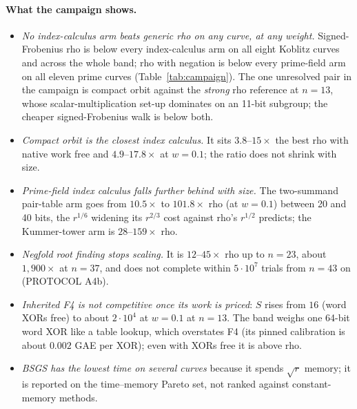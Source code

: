 \paragraph{What the campaign shows.}
\begin{itemize}
\item \emph{No index-calculus arm beats generic rho on any curve, at any
  weight.} Signed-Frobenius rho is below every index-calculus arm on all
  eight Koblitz curves and across the whole band; rho with negation is
  below every prime-field arm on all eleven prime curves
  (Table~\ref{tab:campaign}). The one unresolved pair in the campaign is
  compact orbit against the \emph{strong} rho reference at $n=13$, whose
  scalar-multiplication set-up dominates on an 11-bit subgroup; the
  cheaper signed-Frobenius walk is below both.
\item \emph{Compact orbit is the closest index calculus.} It sits
  $3.8$--$15\times$ the best rho with native work free and
  $4.9$--$17.8\times$ at $w=0.1$; the ratio does not shrink with size.
\item \emph{Prime-field index calculus falls further behind with size.}
  The two-summand pair-table arm goes from $10.5\times$ to $101.8\times$
  rho (at $w=0.1$) between 20 and 40 bits, the $r^{1/6}$ widening its
  $r^{2/3}$ cost against rho's $r^{1/2}$ predicts; the Kummer-tower arm is
  $28$--$159\times$ rho.
\item \emph{Negfold root finding stops scaling.} It is $12$--$45\times$
  rho up to $n=23$, about $1{,}900\times$ at $n=37$, and does not complete
  within $5\cdot10^7$ trials from $n=43$ on (PROTOCOL A4b).
\item \emph{Inherited F4 is not competitive once its work is priced}:
  $S$ rises from $16$ (word XORs free) to about $2\cdot10^4$ at
  $w=0.1$ at $n=13$. The band weighs one 64-bit word XOR like a table
  lookup, which overstates F4 (its pinned calibration is about
  $0.002$ GAE per XOR); even with XORs free it is above rho.
\item \emph{BSGS has the lowest time on several curves} because it spends
  $\sqrt r$ memory; it is reported on the time--memory Pareto set, not
  ranked against constant-memory methods.
\end{itemize}

